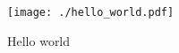 \documentclass{article}
\begin{document}
\begin{figure}[hbtp] 
\centering
\texttt{[image: ./hello\_world.pdf]}
\caption{Hello world}
\label{fig:hello world}
\end{figure}
\end{document}
